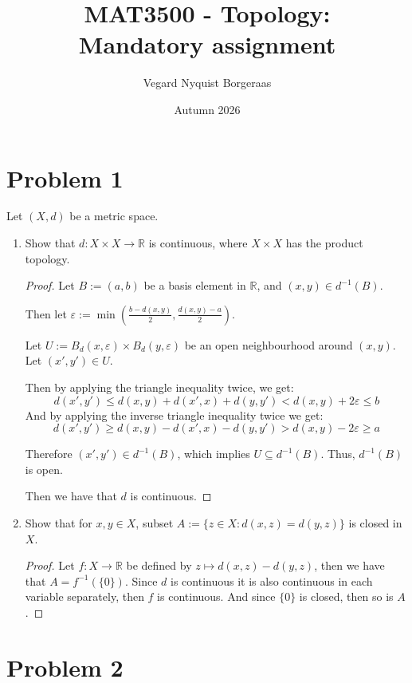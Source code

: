\documentclass[a4paper,11pt]{article}
\title{MAT3500 - Topology: \\ Mandatory assignment}
\author{Vegard Nyquist Borgeraas}
\date{Autumn 2026}
\newcommand{\R}{\mathbb{R}}
\newcommand{\inv}[1]{#1^{-1}}
\newcommand{\eps}{\varepsilon}
\begin{document}
\maketitle

\section*{Problem 1}
Let $(X, d)  $ be a metric space.

\begin{enumerate}[label=\textbf{(\alph*)}]
    \item Show that $d \colon X \times X \to \R$ is continuous, where $X \times X $ has the product topology.

    \begin{proof}
    Let $B := (a,b)$ be a basis element in $\R$, and $(x,y) \in \inv{d}(B)$.
    
    Then let $\eps := \min\left(\frac{b-d(x,y)}{2}, \frac{d(x,y)-a}{2}\right)$.
    
    Let $U := B_d(x,\eps) \times B_d(y,\eps)$ be an open neighbourhood around $(x,y)$.
    Let $(x',y') \in U$.
    
    Then by applying the triangle inequality twice, we get:
    \[ d(x',y') \leq d(x,y) + d(x',x) + d(y,y') < d(x,y) + 2\eps \leq b\]
    And by applying the inverse triangle inequality twice we get:
    \[ d(x',y') \geq d(x,y) - d(x',x) - d(y,y') > d(x,y) - 2\eps \geq a\]
    
    Therefore $(x',y') \in \inv{d}(B)$, which implies $U \subseteq \inv{d}(B)$. Thus, $\inv{d}(B)$ is open.
    
    Then we have that $d$ is continuous.
    \end{proof}

    \item Show that for $x,y \in X$, subset $A:=\{z \in X : d(x,z) = d(y,z)\}$ is closed in $X$.

    \begin{proof}
    Let $f \colon X \to \R$ be defined by $z \mapsto d(x,z)-d(y,z)$, then we have that $A = \inv{f}(\{0\})$. Since $d$ is continuous it is also continuous in each variable separately, then $f$ is continuous. And since $\{0\}$ is closed, then so is $A$.
    \end{proof}
\end{enumerate}

\newpage

\section*{Problem 2}
\end{document}
